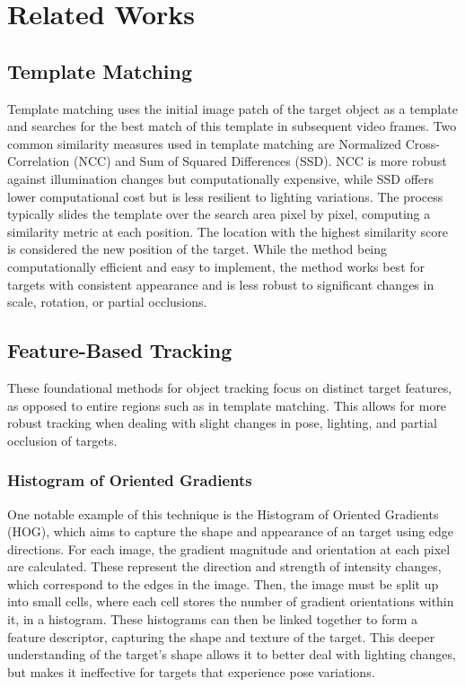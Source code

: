 \documentclass[11pt, letterpaper]{article}
\begin{document}
\section{Related Works}
\subsection{Template Matching}

Template matching uses the initial image patch of the target object as a template and searches for the best match of this template in subsequent video frames. Two common similarity measures used in template matching are Normalized Cross-Correlation (NCC) and Sum of Squared Differences (SSD). NCC is more robust against illumination changes but computationally expensive, while SSD offers lower computational cost but is less resilient to lighting variations. The process typically slides the template over the search area pixel by pixel, computing a similarity metric at each position. The location with the highest similarity score is considered the new position of the target. While the method being computationally efficient and easy to implement, the method works best for targets with consistent appearance and is less robust to significant changes in scale, rotation, or partial occlusions. 

\subsection{Feature-Based Tracking}

These foundational methods for object tracking focus on distinct target features, as opposed to entire regions such as in template matching. This allows for more robust tracking when dealing with slight changes in pose, lighting, and partial occlusion of targets.

\subsubsection{Histogram of Oriented Gradients}

One notable example of this technique is the Histogram of Oriented Gradients (HOG), which aims to capture the shape and appearance of an target using edge directions. For each image, the gradient magnitude and orientation at each pixel are calculated. These represent the direction and strength of intensity changes, which correspond to the edges in the image. Then, the image must be split up into small cells, where each cell stores the number of gradient orientations within it, in a histogram. These histograms can then be linked together to form a feature descriptor, capturing the shape and texture of the target. This deeper understanding of the target's shape allows it to better deal with lighting changes, but makes it ineffective for targets that experience pose variations.
\end{document}
